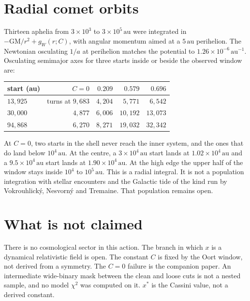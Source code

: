 \section{Radial comet orbits}

Thirteen aphelia from \(3\times10^{3}\) to \(3\times10^{5}\,\mathrm{au}\) were integrated in \(-\mathrm{GM}/r^2+g_W(r;C)\), with angular momentum aimed at a \(5\,\mathrm{au}\) perihelion. The Newtonian osculating \(1/a\) at perihelion matches the potential to \(1.26\times10^{-6}\,\mathrm{au^{-1}}\). Osculating semimajor axes for three starts inside or beside the observed window are:

\begin{center}
\begin{tabular}{lrrrr}
\hline
start (au) & \(C=0\) & \(0.209\) & \(0.579\) & \(0.696\) \\
\hline
\(13{,}925\) & turns at \(9{,}683\) & \(4{,}204\) & \(5{,}771\) & \(6{,}542\) \\
\(30{,}000\) & \(4{,}877\) & \(6{,}006\) & \(10{,}192\) & \(13{,}073\) \\
\(94{,}868\) & \(6{,}270\) & \(8{,}271\) & \(19{,}032\) & \(32{,}342\) \\
\hline
\end{tabular}
\end{center}

At \(C=0\), two starts in the shell never reach the inner system, and the ones that do land below \(10^{4}\,\mathrm{au}\). At the centre, a \(3\times10^{4}\,\mathrm{au}\) start lands at \(1.02\times10^{4}\,\mathrm{au}\) and a \(9.5\times10^{4}\,\mathrm{au}\) start lands at \(1.90\times10^{4}\,\mathrm{au}\). At the high edge the upper half of the window stays inside \(10^{4}\) to \(10^{5}\,\mathrm{au}\). This is a radial integral. It is not a population integration with stellar encounters and the Galactic tide of the kind run by Vokrouhlick\'y, Nesvorn\'y and Tremaine. That population remains open.

\section{What is not claimed}

There is no cosmological sector in this action. The branch in which \(x\) is a dynamical relativistic field is open. The constant \(C\) is fixed by the Oort window, not derived from a symmetry. The \(C=0\) failure is the companion paper. An intermediate wide-binary mask between the clean and loose cuts is not a nested sample, and no model \(\chi^2\) was computed on it. \(x^*\) is the Cassini value, not a derived constant.


